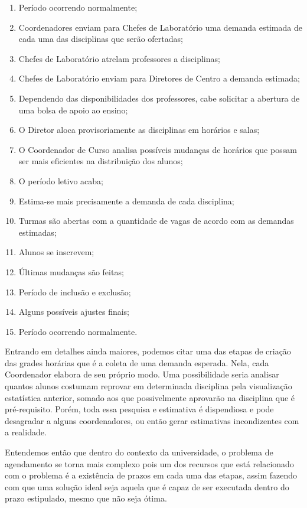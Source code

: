 \begin{enumerate}
  \item Período ocorrendo normalmente;
  \item Coordenadores enviam para Chefes de Laboratório uma demanda estimada de cada uma das disciplinas que serão ofertadas;
  \item Chefes de Laboratório atrelam professores a disciplinas;
  \item Chefes de Laboratório enviam para Diretores de Centro a demanda estimada;
  \item Dependendo das disponibilidades dos professores, cabe solicitar a abertura de uma bolsa de apoio ao ensino;
  \item O Diretor aloca provisoriamente as disciplinas em horários e salas;
  \item O Coordenador de Curso analisa possíveis mudanças de horários que possam ser mais eficientes na distribuição dos alunos;
  \item O período letivo acaba;
  \item Estima-se mais precisamente a demanda de cada disciplina;
  \item Turmas são abertas com a quantidade de vagas de acordo com as demandas estimadas;
  \item Alunos se inscrevem;
  \item Últimas mudanças são feitas;
  \item Período de inclusão e exclusão;
  \item Alguns possíveis ajustes finais;
  \item Período ocorrendo normalmente.
\end{enumerate}

Entrando em detalhes ainda maiores, podemos citar uma das etapas de criação das grades horárias que é a coleta de uma demanda esperada. Nela, cada Coordenador elabora de seu próprio modo. Uma possibilidade seria analisar quantos alunos costumam reprovar em determinada disciplina pela visualização estatística anterior, somado aos que possivelmente aprovarão na disciplina que é pré-requisito. Porém, toda essa pesquisa e estimativa é dispendiosa e pode desagradar a alguns coordenadores, ou então gerar estimativas incondizentes com a realidade.

Entendemos então que dentro do contexto da universidade, o problema de agendamento se torna mais complexo pois um dos recursos que está relacionado com o problema é a existência de prazos em cada uma das etapas, assim fazendo com que uma solução ideal seja aquela que é capaz de ser executada dentro do prazo estipulado, mesmo que não seja ótima.

